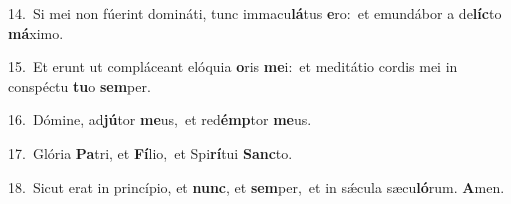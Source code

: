 {\numbfont\textcolor{\numbcolor}{14.}}~Si mei non fúerint domináti, tunc immacu\-\textbf{lá}\-tus \textbf{e}\-ro:~\star et emundábor a de\-\textbf{líc}\-to \textbf{má}\-ximo.\par
{\numbfont\textcolor{\numbcolor}{15.}}~Et erunt ut compláceant elóquia \textbf{o}\-ris \textbf{me}\-i:~\star et meditátio cordis mei in conspéctu \textbf{tu}\-o \textbf{sem}\-per.\par
{\numbfont\textcolor{\numbcolor}{16.}}~Dómine, ad\-\textbf{jú}\-tor \textbf{me}\-us,~\star et red\-\textbf{émp}\-tor \textbf{me}\-us.\par
{\numbfont\textcolor{\numbcolor}{17.}}~Glória \textbf{Pa}\-tri, et \textbf{Fí}\-lio,~\star et Spi\-\textbf{rí}\-tui \textbf{Sanc}\-to.\par
{\numbfont\textcolor{\numbcolor}{18.}}~Sicut erat in princípio, et \textbf{nunc}\-, et \textbf{sem}\-per,~\star et in sǽcula sæcu\-\textbf{ló}\-rum. \textbf{A}\-men.\par
